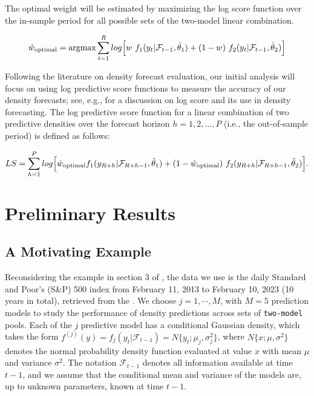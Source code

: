 \documentclass{monashthesis}
\begin{document}
The optimal weight will be estimated by maximizing the log score function over the in-sample period for all possible sets of the two-model linear combination.

\begin{equation}
\hat{w}_{\text{optimal}} = \text{argmax} \sum^R_{t=1}log \Big[w \ f_1(y_t |\mathcal{F}_{\small{t-1}}, \hat\theta_1) + (1-w) \ f_2(y_t|\mathcal{F}_{\small{t-1}}, \hat\theta_2)\Big] 
\end{equation}

Following the literature on density forecast evaluation, our initial analysis will focus on using log predictive score functions to measure the accuracy of our density forecasts; see, e.g., \textcite{GA11} for a discussion on log score and its use in density forecasting. The log predictive score function for a linear combination of two predictive densities over the forecast horizon \(h=1,2,...,P\) (i.e., the out-of-sample period) is defined as follows:

\begin{equation}
\label{eqn:LS}
LS = \sum^P_{h=1} log \Big[ \hat{w}_{\text{optimal}} f_1(y_{\small{R+h}}| \mathcal{F}_{\small{R+h-1}}, \hat\theta_1) + (1-\hat{w}_{\text{optimal}}) \ f_2(y_{\small{R+h}}| \mathcal{F}_{\small{R+h-1}}, \hat\theta_2)\Big].
\end{equation}

\hypertarget{preliminary-results}{%
\chapter{Preliminary Results}\label{preliminary-results}}

\hypertarget{a-motivating-example}{%
\section{A Motivating Example}\label{a-motivating-example}}

Reconsidering the example in section 3 of \textcite{GA11}, the data we use is the daily Standard and Poor's (S\&P) 500 index from February 11, 2013 to February 10, 2023 (10 years in total), retrieved from the \textcite{SP500}. We choose \(j=1,\cdots,M\), with \(M=5\) prediction models to study the performance of density predictions across sets of \texttt{two-model} pools. Each of the \(j\) predictive model has a conditional Gaussian density, which takes the form \(f^{(j)}(y)=f_j(y_t|\mathcal{F}_{t-1})=N\{y_t; \mu_j, \sigma^2_j\}\), where \(N\{x; \mu, \sigma^2\}\) denotes the normal probability density function evaluated at value \(x\) with mean \(\mu\) and variance \(\sigma^2\). The notation \(\mathcal{F}_{t-1}\) denotes all information available at time \(t-1\), and we assume that the conditional mean and variance of the models are, up to unknown parameters, known at time \(t-1\).
\end{document}
